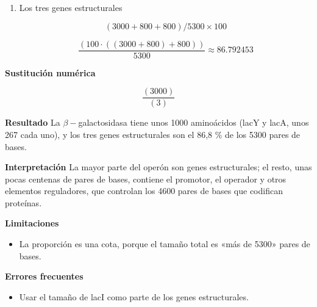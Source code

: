 \documentclass{book}
\begin{document}
\begin{tcolorbox}[title={Problema resuelto}, studiumworked, breakable]
\begin{enumerate}
\[
\frac{3000}{3} = 1000
\]
\item
Los tres genes estructurales


\[
(3000+800+800)/5300 \times 100
\]

\[
\frac{\left(100\cdot \left(\left(3000+800\right)+800\right)\right)}{5300} \approx 86.792453
\]
\end{enumerate}

\noindent\textbf{Sustitución numérica}

\[
\frac{\left(3000\right)}{\left(3\right)}
\]

\noindent\textbf{Resultado}
La \(\beta-\)galactosidasa tiene unos 1000 aminoácidos (lacY y lacA, unos 267 cada uno), y los tres genes estructurales son el 86,8 \% de los 5300 pares de bases.


\noindent\textbf{Interpretación}
La mayor parte del operón son genes estructurales; el resto, unas pocas centenas de pares de bases, contiene el promotor, el operador y otros elementos reguladores, que controlan los 4600 pares de bases que codifican proteínas.


\noindent\textbf{Limitaciones}
\begin{itemize}
\item La proporción es una cota, porque el tamaño total es «más de 5300» pares de bases.
\end{itemize}

\noindent\textbf{Errores frecuentes}
\begin{itemize}
\item Usar el tamaño de lacI como parte de los genes estructurales.
\end{itemize}
\end{tcolorbox}
\end{document}
